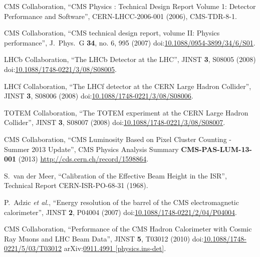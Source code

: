 \begin{thebibliography}{99}
CMS Collaboration, ``CMS Physics : Technical Design Report Volume 1: Detector Performance and Software'', CERN-LHCC-2006-001 (2006), CMS-TDR-8-1. 

CMS Collaboration, ``CMS technical design report, volume II: Physics performance'', J.\ Phys.\ G {\bf 34}, no. 6, 995 (2007) doi:\href{http://dx.doi.org/10.1088/0954-3899/34/6/S01}{10.1088/0954-3899/34/6/S01}.

LHCb Collaboration, ``The LHCb Detector at the LHC'', JINST {\bf 3}, S08005 (2008) doi:\href{http://dx.doi.org/10.1088/1748-0221/3/08/S08005}{10.1088/1748-0221/3/08/S08005}.

LHCf Collaboration, ``The LHCf detector at the CERN Large Hadron Collider'', JINST {\bf 3}, S08006 (2008) doi:\href{http://dx.doi.org/10.1088/1748-0221/3/08/S08006}{10.1088/1748-0221/3/08/S08006}.

TOTEM Collaboration, ``The TOTEM experiment at the CERN Large Hadron Collider'', JINST {\bf 3}, S08007 (2008) doi:\href{http://dx.doi.org/10.1088/1748-0221/3/08/S08007}{10.1088/1748-0221/3/08/S08007}.

CMS Collaboration, ``CMS Luminosity Based on Pixel Cluster Counting - Summer 2013 Update'', CMS Physics Analysis Summary {\bf CMS-PAS-LUM-13-001} (2013) \url{http://cds.cern.ch/record/1598864}.

S.~van der Meer, ``Calibration of the Effective Beam Height in the ISR'', Technical Report CERN-ISR-PO-68-31 (1968).



P.~Adzic {\it et al.}, ``Energy resolution of the barrel of the CMS electromagnetic calorimeter'', JINST {\bf 2}, P04004 (2007) doi:\href{http://dx.doi.org/10.1088/1748-0221/2/04/P04004}{10.1088/1748-0221/2/04/P04004}. 

CMS Collaboration, ``Performance of the CMS Hadron Calorimeter with Cosmic Ray Muons and LHC Beam Data'', JINST {\bf 5}, T03012 (2010) doi:\href{http://dx.doi.org/10.1088/1748-0221/5/03/T03012}{10.1088/1748-0221/5/03/T03012} arXiv:\href{https://arxiv.org/abs/0911.4991}{0911.4991 [physics.ins-det]}.


\end{thebibliography}
